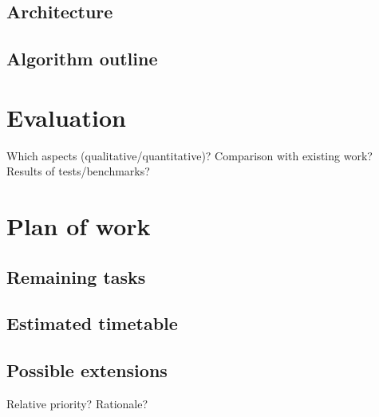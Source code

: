 \documentclass{icldt}
\begin{document}
\section{Architecture}
\section{Algorithm outline}
\chapter{Evaluation}

Which aspects (qualitative/quantitative)? Comparison with existing work? Results of tests/benchmarks?
\chapter{Plan of work}
\section{Remaining tasks}
\section{Estimated timetable}
\section{Possible extensions}

Relative priority? Rationale?


\nocite{*}
\end{document}
